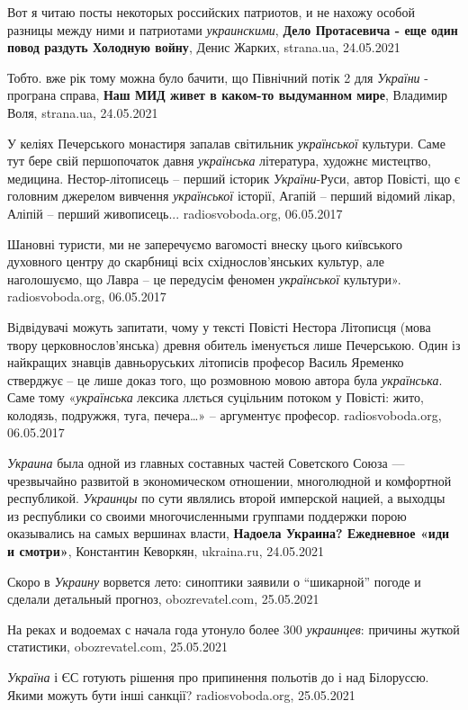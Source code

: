 Вот я читаю посты некоторых российских патриотов, и не нахожу особой разницы
между ними и патриотами \emph{украинскими},
\textbf{Дело Протасевича - еще один повод раздуть Холодную войну}, Денис Жарких, strana.ua, 24.05.2021

Тобто. вже рік тому можна було бачити, що Північний потік 2 для \emph{України}
- програна справа, \textbf{Наш МИД живет в каком-то выдуманном мире}, Владимир
Воля, strana.ua, 24.05.2021

У келіях Печерського монастиря запалав світильник \emph{української} культури. Саме
тут бере свій першопочаток давня \emph{українська} література, художнє мистецтво,
медицина. Нестор-літописець – перший історик \emph{України}-Руси, автор Повісті, що є
головним джерелом вивчення \emph{української} історії, Агапій – перший відомий лікар,
Аліпій – перший живописець...
radiosvoboda.org, 06.05.2017

Шановні туристи, ми не заперечуємо вагомості внеску цього київського духовного
центру до скарбниці всіх східнослов'янських культур, але наголошуємо, що Лавра
– це передусім феномен \emph{української} культури».
radiosvoboda.org, 06.05.2017

Відвідувачі можуть запитати, чому у тексті Повісті Нестора Літописця (мова
твору церковнослов'янська) древня обитель іменується лише Печерською. Один із
найкращих знавців давньоруських літописів професор Василь Яременко стверджує –
це лише доказ того, що розмовною мовою автора була \emph{українська}. Саме тому
«\emph{українська} лексика ллється суцільним потоком у Повісті: жито, колодязь,
подружжя, туга, печера…» – аргументує професор.
radiosvoboda.org, 06.05.2017

\emph{Украина} была одной из главных составных частей Советского Союза — чрезвычайно
развитой в экономическом отношении, многолюдной и комфортной республикой.
\emph{Украинцы} по сути являлись второй имперской нацией, а выходцы из республики со
своими многочисленными группами поддержки порою оказывались на самых вершинах
власти, \textbf{Надоела Украина? Ежедневное «иди и смотри»}, Константин Кеворкян, ukraina.ru, 24.05.2021

Скоро в \emph{Украину} ворвется лето: синоптики заявили о \enquote{шикарной} погоде и сделали детальный прогноз, obozrevatel.com,
25.05.2021

На реках и водоемах с начала года утонуло более 300 \emph{украинцев}: причины жуткой
статистики, obozrevatel.com, 25.05.2021

\emph{Україна} і ЄС готують рішення про припинення польотів до і над Білоруссю.
Якими можуть бути інші санкції? radiosvoboda.org, 25.05.2021

